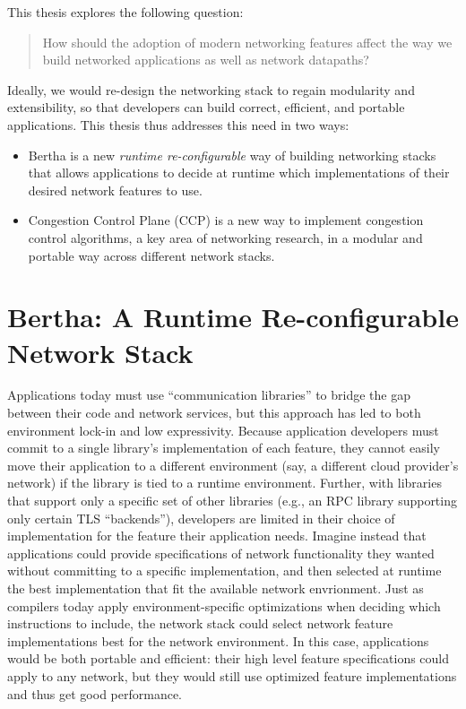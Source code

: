 This thesis explores the following question:

\begin{quote}
How should the adoption of modern networking features affect the way we build networked applications as well as network datapaths?
\end{quote}
\noindent
Ideally, we would re-design the networking stack to regain modularity and extensibility, so that developers can build correct, efficient, and portable applications.
This thesis thus addresses this need in two ways:

\begin{itemize}
  \item Bertha is a new \emph{runtime re-configurable} way of building networking stacks that allows applications to decide at runtime which implementations of their desired network features to use. 
  \item Congestion Control Plane (CCP) is a new way to implement congestion control algorithms, a key area of networking research, in a modular and portable way across different network stacks.
\end{itemize}

\section{Bertha: A Runtime Re-configurable Network Stack}

Applications today must use ``communication libraries'' to bridge the gap between their code and network services, but this approach has led to both environment lock-in and low expressivity. Because application developers must commit to a single library's implementation of each feature, they cannot easily move their application to a different environment (say, a different cloud provider's network) if the library is tied to a runtime environment.
Further, with libraries that support only a specific set of other libraries (e.g., an RPC library supporting only certain TLS ``backends''), developers are limited in their choice of implementation for the feature their application needs.
Imagine instead that applications could provide specifications of network functionality they wanted without committing to a specific implementation, and then selected at runtime the best implementation that fit the available network envrionment. 
Just as compilers today apply environment-specific optimizations when deciding which instructions to include, the network stack could select network feature implementations best for the network environment. 
In this case, applications would be both portable and efficient: their high level feature specifications could apply to any network, but they would still use optimized feature implementations and thus get good performance.

